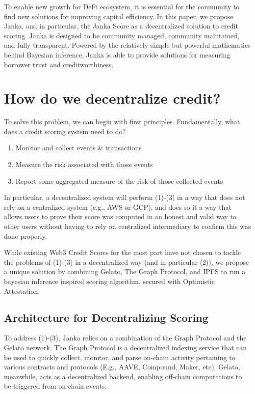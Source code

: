 \documentclass{article}
\begin{document}
    To enable new growth for DeFi ecosystem, it is essential for the community to find new solutions for improving capital efficiency. In this paper, we propose Janka, and in particular, the Janka Score as a decentralized solution to credit scoring. Janka is designed to be community managed, community maintained, and fully transparent. Powered by the relatively simple but powerful mathematics behind Bayesian inference, Janka is able to provide solutions for measuring borrower trust and creditworthiness.

\section{How do we decentralize credit?}
To solve this problem, we can begin with first principles. Fundamentally, what does a credit scoring system need to do?

\begin{enumerate}
    \item Monitor and collect events \& transactions
    \item Measure the risk associated with those events
    \item Report some aggregated measure of the risk of those collected events
\end{enumerate}

In particular, a decentralized system will perform (1)-(3) in a way that does not rely on a centralized system (e.g., AWS or GCP), and does so it a way that allows users to prove their score was computed in an honest and valid way to other users without having to rely on centralized intermediary to confirm this was done properly.

While existing Web3 Credit Scores for the most part have not chosen to tackle the problems of (1)-(3) in a decentralized way (and in particular (2)), we propose a unique solution by combining Gelato, The Graph Protocol, and IPFS to run a bayesian inference inspired scoring algorithm, secured with Optimistic Attestation.

\subsection{Architecture for Decentralizing Scoring}
To address (1)-(3), Janka relies on a combination of the Graph Protocol and the Gelato network. The Graph Protocol is a decentralized indexing service that can be used to quickly collect, monitor, and parse on-chain activity pertaining to various contracts and protocols (E.g., AAVE, Compound, Maker, etc). Gelato, meanwhile, acts as a decentralized backend, enabling off-chain computations to be triggered from on-chain events. 
\end{document}
